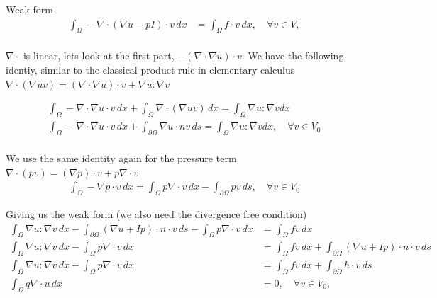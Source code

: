 \documentclass[a4paper,12pt]{article}
\theoremstyle{exerciseStyle}
\theoremstyle{solutionStyle}
\begin{document}
\begin{solution}{6.6}
    Weak form
    \begin{align*}
        \int_{\Omega} - \nabla \cdot \left( \nabla u   - p I \right) \cdot v \, dx & = \int_{\Omega} f \cdot v \, dx, \quad \forall v \in V, \\
    \end{align*}

    \( \nabla \cdot \) is linear, lets look at the first part, \( - (\nabla \cdot \nabla u) \cdot v \).
    We have the following identiy, similar to the classical product rule in elementary calculus
    \( \nabla \cdot (\nabla u v) = (\nabla \cdot \nabla u)  \cdot v  + \nabla u  : \nabla v\)

    \begin{align*}
        \int_{\Omega} - \nabla \cdot \nabla u \cdot v \, dx + \int_{\Omega} \nabla \cdot ( \nabla u v)  \, dx = \int_{\Omega} \nabla u : \nabla v dx                           \\
        \int_{\Omega} - \nabla \cdot \nabla u \cdot v \, dx + \int_{\partial \Omega} \nabla u \cdot n v  \, ds = \int_{\Omega} \nabla u : \nabla v dx, \quad \forall v \in V_0 \\
    \end{align*}


    We use the same identity again for the pressure term \( \nabla \cdot (p v) = (\nabla p) \cdot v + p  \nabla \cdot v\)
    \begin{align*}
        \int_{\Omega} - \nabla p \cdot v \, dx = \int_{\Omega} p \nabla \cdot v \, dx - \int_{\partial \Omega} p v \, ds, \quad \forall v \in V_0
    \end{align*}

    Giving us the weak form (we also need the divergence free condition)
    \begin{align*}
        \int_{\Omega} \nabla u : \nabla v \, dx  - \int_{\partial \Omega} (\nabla u + Ip) \cdot n \cdot v  \, ds - \int_{\Omega} p \nabla \cdot v \, dx & = \int_{\Omega} f v \, dx                                                                                 \\
        \int_{\Omega} \nabla u : \nabla v \, dx  - \int_{\Omega} p \nabla \cdot v \, dx                                                                 & = \int_{\Omega} f v \, dx +   \int_{\partial \Omega} \left( \nabla u + I p \right) \cdot n \cdot v  \, ds \\
        \int_{\Omega} \nabla u : \nabla v \, dx  - \int_{\Omega} p \nabla \cdot v \, dx                                                                 & = \int_{\Omega} f v \, dx +   \int_{\partial \Omega} h \cdot v  \, ds                                     \\
        \int_{\Omega} q \nabla \cdot u \, dx                                                                                                            & = 0, \quad \forall v \in V_0,                                                                             \\
    \end{align*}


\end{solution}
\end{document}
